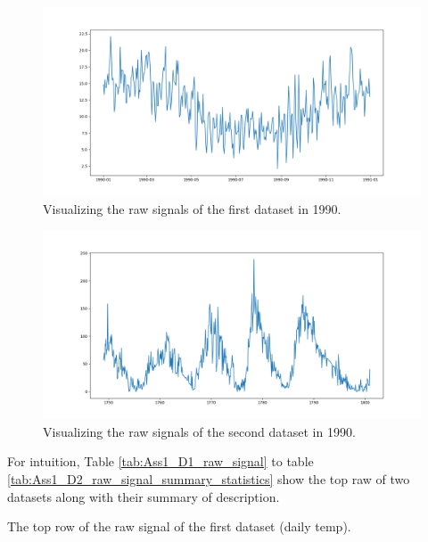\documentclass[12pt]{article}
\begin{document}
\begin{enumerate}
\begin{figure}[]
    \centering
    \begin{minipage}[b]{1\textwidth}
        \includegraphics[width=\textwidth]{figures/Ass1/Ass1_D1_raw_signal_1990.png}
    \end{minipage}
    \caption{Visualizing the raw signals of the first dataset in 1990.}
    \label{fig:Ass1_D1_raw_signal_1990}
\end{figure}

\begin{figure}[]
    \centering
    \begin{minipage}[b]{1\textwidth}
        \includegraphics[width=\textwidth]{figures/Ass1/Ass1_D2_raw_signal_1990.png}
    \end{minipage}
    \caption{Visualizing the raw signals of the second dataset in 1990.}
    \label{fig:Ass1_D2_raw_signal_1990}
\end{figure}

For intuition, Table \ref{tab:Ass1_D1_raw_signal} to table \ref{tab:Ass1_D2_raw_signal_summary_statistics} show the top raw of two datasets along with their summary of description.


\begin{table}[]
 \centering
\caption{The top row of the raw signal of the first dataset (daily temp).
{\label{tab:Ass1_D1_raw_signal}}}

\end{table}


\end{enumerate}
\end{document}
